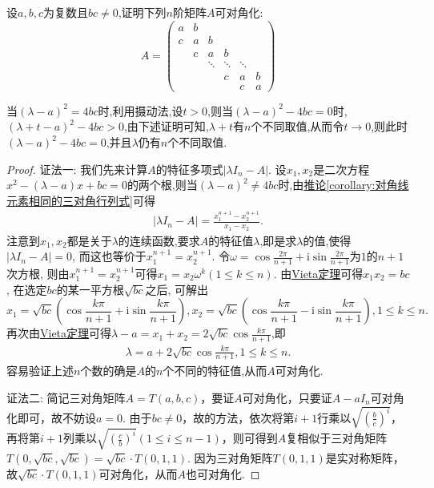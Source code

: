 \documentclass[../../main.tex]{subfiles}%
\begin{document}
\begin{proposition}\label{proposition:三对角矩阵必可对角化}
设$a,b,c$为复数且$bc\neq0$,证明下列$n$阶矩阵$A$可对角化:
\[
A = 
\begin{pmatrix}
a&b&&&\\
c&a&b&&\\
&c&a&b&\\
&&\ddots&\ddots&\ddots\\
&&&c&a&b\\
&&&&c&a
\end{pmatrix}
\]
\end{proposition}
\begin{note}
当$(\lambda-a)^2=4bc$时,利用摄动法,设$t>0$,则当$(\lambda-a)^2-4bc=0$时,$(\lambda+t-a)^2-4bc>0$,由下述证明可知,$\lambda+t$有$n$个不同取值,从而令$t \to 0$,则此时$(\lambda-a)^2-4bc=0$,并且$\lambda$仍有$n$个不同取值.
\end{note}
\begin{proof}

{\color{blue}证法一:}
我们先来计算$A$的特征多项式$|\lambda I_n - A|$. 设$x_1,x_2$是二次方程$x^2 - (\lambda - a)x + bc = 0$的两个根,则当$(\lambda-a)^2\ne 4bc$时,由\hyperref[corollary:对角线元素相同的三对角行列式]{推论\ref{corollary:对角线元素相同的三对角行列式}}可得
\begin{align*}
|\lambda I_n - A|=\frac{x_1^{n + 1}-x_2^{n + 1}}{x_1 - x_2}.
\end{align*}
注意到$x_1,x_2$都是关于$\lambda$的连续函数,要求$A$的特征值$\lambda$,即是求$\lambda$的值,使得$|\lambda I_n - A| = 0$, 而这也等价于$x_1^{n + 1}=x_2^{n + 1}$. 令$\omega=\cos\frac{2\pi}{n + 1}+\mathrm{i}\sin\frac{2\pi}{n + 1}$为$1$的$n + 1$次方根, 则由$x_1^{n + 1}=x_2^{n + 1}$可得$x_1 = x_2\omega^k(1\leqslant  k\leqslant  n)$. 由\hyperref[theorem:Vieta定理]{Vieta定理}可得$x_1x_2 = bc$, 在选定$bc$的某一平方根$\sqrt{bc}$之后, 可解出
\[
x_1=\sqrt{bc}\left(\cos\frac{k\pi}{n + 1}+\mathrm{i}\sin\frac{k\pi}{n + 1}\right), x_2=\sqrt{bc}\left(\cos\frac{k\pi}{n + 1}-\mathrm{i}\sin\frac{k\pi}{n + 1}\right), 1\leqslant  k\leqslant  n.
\]
再次由\hyperref[theorem:Vieta定理]{Vieta定理}可得$\lambda - a = x_1 + x_2 = 2\sqrt{bc}\cos\frac{k\pi}{n + 1}$,即
\begin{align*}
\lambda=a + 2\sqrt{bc}\cos\frac{k\pi}{n + 1}, 1\leqslant  k\leqslant  n.
\end{align*}
容易验证上述$n$个数的确是$A$的$n$个不同的特征值,从而$A$可对角化.

{\color{blue}证法二:}
简记三对角矩阵\(A = T(a,b,c)\)，要证\(A\)可对角化，只要证\(A - aI_n\)可对角化即可，故不妨设\(a = 0\). 由于\(bc\neq0\)，故的方法，依次将第\(i + 1\)行乘以\(\sqrt{(\frac{b}{c})^i}\)，再将第\(i + 1\)列乘以\(\sqrt{(\frac{c}{b})^i}(1\leqslant  i\leqslant  n - 1)\)，则可得到\(A\)复相似于三对角矩阵\(T(0,\sqrt{bc},\sqrt{bc})=\sqrt{bc}\cdot T(0,1,1)\). 因为三对角矩阵\(T(0,1,1)\)是实对称矩阵，故\(\sqrt{bc}\cdot T(0,1,1)\)可对角化，从而\(A\)也可对角化. 

\end{proof}
\end{document}
